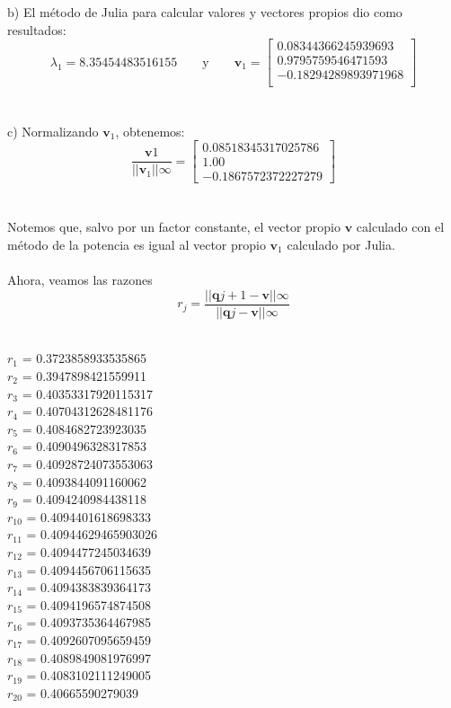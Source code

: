 \documentclass[11pt]{article}
\begin{document}
b) El método de Julia para calcular valores y vectores propios dio como resultados:
\[
 \lambda_1 = 8.35454483516155
 \qquad\text{y}\qquad
 \textbf{v}_1 = \begin{bmatrix}
0.08344366245939693 \\
0.9795759546471593 \\
-0.18294289893971968 \\
\end{bmatrix}
 \]
 \\
 \\

 c) Normalizando $\textbf{v}_1$, obtenemos:
 $$\frac{\textbf{v}1}{||\textbf{v}_1||\infty} =
\begin{bmatrix}
0.08518345317025786 \\
1.00 \\
-0.1867572372227279
\end{bmatrix}$$
\\
\\

Notemos que, salvo por un factor constante, el vector propio $\textbf{v}$ calculado con el método de la potencia es igual al vector propio $\textbf{v}_1$ calculado por Julia.
\\
\\

Ahora, veamos las razones
$$
r_j = \frac{||\textbf{q}{j+1} - \textbf{v}||\infty}{||\textbf{q}{j} - \textbf{v}||\infty}
$$
\\

\begin{multicols}{3}
\noindent
$r_1$ = 0.3723858933535865 \\
$r_2$ = 0.3947898421559911 \\
$r_3$ = 0.40353317920115317 \\
$r_4$ = 0.40704312628481176 \\
$r_5$ = 0.4084682723923035 \\
$r_6$ = 0.4090496328317853 \\
$r_7$ = 0.40928724073553063 \\
$r_8$ = 0.4093844091160062 \\
$r_9$ = 0.4094240984438118 \\
$r_{10}$ = 0.4094401618698333 \\
$r_{11}$ = 0.40944629465903026 \\
$r_{12}$ = 0.4094477245034639 \\
$r_{13}$ = 0.4094456706115635 \\
$r_{14}$ = 0.4094383839364173 \\
$r_{15}$ = 0.4094196574874508 \\
$r_{16}$ = 0.4093735364467985 \\
$r_{17}$ = 0.4092607095659459 \\
$r_{18}$ = 0.4089849081976997 \\
$r_{19}$ = 0.4083102111249005 \\
$r_{20}$ = 0.40665590279039 \\
\end{multicols}
\end{document}
